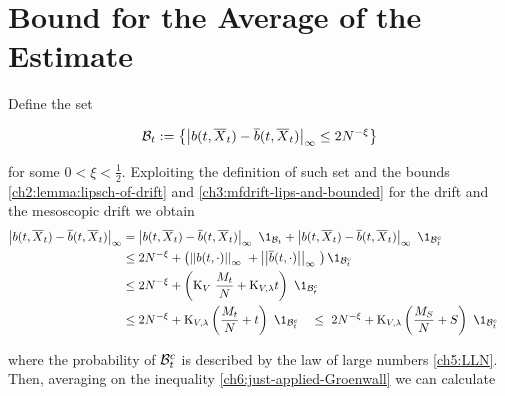 \section{Bound for the Average of the Estimate}\label{ch6:2nd-part-of-the-proof}

Define the set

\begin{equation*}
	\mathcal{B}_t := \left\{
		\left| b(t, \overline{X}_t) - \overline{b}(t, \overline{X}_t) \right|_\infty \leq 2N^{-\xi}
	\right\}
\end{equation*}

for some $0 < \xi < \frac{1}{2}$.
Exploiting the definition of such set and the bounds \ref{ch2:lemma:lipsch-of-drift} and \ref{ch3:mfdrift-lips-and-bounded} for the drift and the mesoscopic drift we obtain
\begin{align*}
	\norm{\drift(t, \mfsol_t) - \mfdrift(t, \mfsol_t)}_\infty 
	&=
		\norm{\drift(t, \mfsol_t) - \mfdrift(t, \mfsol_t)}_\infty\
		\1_{\setB_t
		}
		+
		\norm{\drift(t, \mfsol_t) - \mfdrift(t, \mfsol_t)}_\infty\
		\1_{\setB_t^c
		}
		\\
		&\leq
			2N^{-\xi}
			+
			\left(
				\Norm{\drift(t, \cdot)}_\infty\
				+
				\Norm{\mfdrift(t, \cdot)}_\infty\
			\right)
			\1_{\setB_t^c}
		\\
		&\leq
		2N^{-\xi}
		+
		\left(
			\const_{\attraction}\
			\frac{\hmactive_t}{N}
			+
			\const_{\attraction, \lambda} t
		\right)\
		\1_{\setB_t^c}
		\\
		&\leq
		2N^{-\xi}
		+
		\const_{\attraction, \lambda} 
		\left(
		\frac{\hmactive_t}{N}
		+
		t
		\right)\
		\1_{\setB_t^c}\quad
		\leq\
		2N^{-\xi}
		+
		\const_{\attraction, \lambda} 
		\left(
		\frac{\hmactive_S}{N}
		+
		S
		\right)\
		\1_{\setB_t^c}\quad
\end{align*}

where the probability of $\mathcal{B}_t^c$ is described by the law of large numbers \ref{ch5:LLN}.
Then, averaging on the inequality \ref{ch6:just-applied-Groenwall} we can calculate

